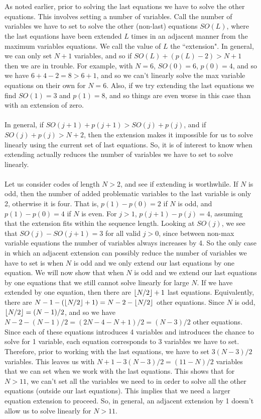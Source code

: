 \documentclass[a4paper]{article}
\DeclarePairedDelimiter\floor{\lfloor}{\rfloor}
\begin{document}
\\\\
As noted earlier, prior to solving the last equations we have to solve the other equations. This involves setting a number of variables. Call the number of variables we have to set to solve the other (non-last) equations $SO(L)$, where the last equations have been extended $L$ times in an adjacent manner from the maximum variables equations. We call the value of $L$ the ``extension". In general, we can only set $N+1$ variables, and so if $SO(L) + (p(L)-2) > N + 1$ then we are in trouble. For example, with $N = 6$, $SO(0) = 6$, $p(0) = 4$, and so we have $6 + 4 - 2 = 8 >  6 + 1$, and so we can't linearly solve the max variable equations on their own for $N=6$. Also, if we try extending the last equations we find $SO(1) = 3$ and $p(1) = 8$, and so things are even worse in this case than with an extension of zero.
\\\\
In general, if $SO(j+1)+p(j+1) > SO(j) + p(j)$, and if $ SO(j) + p(j) > N+2$, then the extension makes it impossible for us to solve linearly using the current set of last equations. So, it is of interest to know when extending actually reduces the number of variables we have to set to solve linearly.
\\\\
Let us consider codes of length $N > 2$, and see if extending is worthwhile. If $N$ is odd, then the number of added problematic variables to the last variable is only 2, otherwise it is four. That is, $p(1) - p(0) = 2$ if $N$ is odd, and $p(1) - p(0) = 4$ if $N$ is even. For $j > 1$, $p(j+1) - p(j) = 4$, assuming that the extension fits within the sequence length. Looking at $SO(j)$, we see that $SO(j) - SO(j+1) = 3$ for all valid $j > 0$, since between non-max variable equations the number of variables always increases by 4. So the only case in which an adjacent extension can possibly reduce the number of variables we have to set is when $N$ is odd and we only extend our last equations by one equation.
\clearpage
We will now show that when $N$ is odd and we extend our last equations by one equations that we still cannot solve linearly for large $N$. If we have extended by one equation, then there are $\floor{N/2} + 1$ last equations. Equivalently, there are $N - 1 - (\floor{N/2} + 1) = N -2 - \floor{N/2}$ other equations. Since $N$ is odd, $\floor{N/2} = (N-1)/2$, and so we have $N -2 - (N-1)/2 = (2N - 4 - N + 1)/2 = (N-3)/2$ other equations. Since each of these equations introduces 4 variables and introduces the chance to solve for 1 variable, each equation corresponds to 3 variables we have to set. Therefore, prior to working with the last equations, we have to set $3(N-3)/2$ variables. This leaves us with $N+1 - 3(N-3)/2 = (11-N)/2$ variables that we can set when we work with the last equations. This shows that for $N > 11$, we can't set all the variables we need to in order to solve all the other equations (outside our last equations). This implies that we need a larger equation extension to proceed. So, in general, an adjacent extension by 1 doesn't allow us to solve linearly for $N > 11$.
\end{document}
